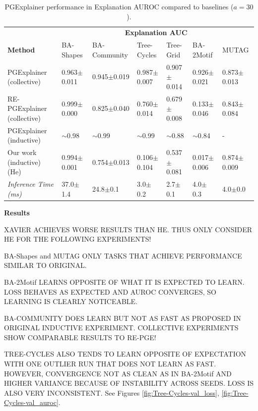 \begin{table}[ht]
    \centering
    \scriptsize
    \begin{tabularx}{\textwidth}{l*{6}{X}}   %
    \toprule
    \textbf{} & \multicolumn{6}{c}{\textbf{Explanation AUC}} \\
    \cmidrule{2-7}
    \textbf{Method} & BA-Shapes & BA-Community & Tree-Cycles & Tree-Grid & BA-2Motif & MUTAG \\
    \midrule
    PGExplainer (collective) & 0.963$\pm$0.011 & 0.945$\pm$0.019 & 0.987$\pm$0.007 & 0.907$\pm$0.014 & 0.926$\pm$0.021 & 0.873$\pm$0.013 \\
    \midrule
    RE-PGExplainer (collective) & 0.999$\pm$0.000 & 0.825$\pm$0.040 & 0.760$\pm$0.014 & 0.679$\pm$0.008 & 0.133$\pm$0.046 & 0.843$\pm$0.084 \\
    \midrule
    PGExplainer (inductive) & $\sim$0.98 & $\sim$0.99 & $\sim$0.99 & $\sim$0.88 & $\sim$0.84 & - \\
    \midrule
    Our work (inductive) (He) & 0.994$\pm$0.001 & 0.754$\pm$0.013 & 0.106$\pm$0.104 & 0.537$\pm$0.081 & 0.017$\pm$0.006 & 0.874$\pm$0.009 \\
    \addlinespace
    \midrule
    \midrule
    \textit{Inference Time (ms)} & 37.0$\pm$1.4 & 24.8$\pm$0.1 & 3.0$\pm$0.2 & 2.7$\pm$0.1 & 4.0$\pm$0.3 & 4.0$\pm$0.0 \\
    \bottomrule
    \end{tabularx}
    \caption[Inductive performance of our reimplementation]{PGExplainer performance in Explanation AUROC compared to baselines ($a=30$).}
    \label{tab:pgexplainer_auc}
\end{table}

\textbf{Results}

XAVIER ACHIEVES WORSE RESULTS THAN HE. THUS ONLY CONSIDER HE FOR THE FOLLOWING EXPERIMENTS!

BA-Shapes and MUTAG ONLY TASKS THAT ACHIEVE PERFORMANCE SIMILAR TO ORIGINAL. 

BA-2Motif LEARNS OPPOSITE OF WHAT IT IS EXPECTED TO LEARN. LOSS BEHAVES AS EXPECTED AND AUROC CONVERGES, SO LEARNING IS CLEARLY NOTICEABLE.

BA-COMMUNITY DOES LEARN BUT NOT AS FAST AS PROPOSED IN ORIGINAL INDUCTIVE EXPERIMENT. COLLECTIVE EXPERIMENTS SHOW COMPARABLE RESULTS TO RE-PGE!

TREE-CYCLES ALSO TENDS TO LEARN OPPOSITE OF EXPECTATION WITH ONE OUTLIER RUN THAT DOES NOT LEARN AS FAST. HOWEVER, CONVERGENCE NOT AS CLEAN AS IN BA-2Motif AND HIGHER VARIANCE BECAUSE OF INSTABILITY ACROSS SEEDS. LOSS IS ALSO VERY INCONSISTENT. See Figures \ref{fig:Tree-Cycles-val_loss}, \ref{fig:Tree-Cycles-val_auroc}.

